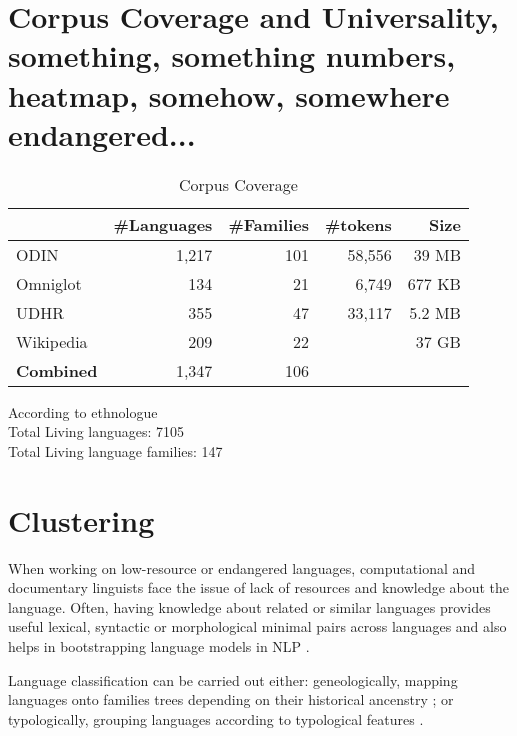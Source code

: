 % 

\section{Corpus Coverage and Universality, something, something numbers, heatmap, somehow, somewhere endangered...}
\begin{table}[h!]
\centering
    \begin{tabular}{l|rrrr}
    ~         				& \#Languages & \#Families 	&\#tokens		& Size	\\ \hline
    ODIN      				& 1,217      & 101       		& 58,556		& 39 MB		\\
    Omniglot  				& 134        & 21        		&	6,749			& 677 KB	\\
    UDHR      				& 355        & 47        		&	33,117		& 5.2 MB	\\
    Wikipedia 				& 209        & 22       		&						& 37 GB		\\ \hline
    \textbf{Combined}	& 1,347			 & 106 
    \end{tabular}
\caption{Corpus Coverage}
\end{table}

\noindent
According to ethnologue \\
Total Living languages: 7105 \\
Total Living language families: 147 \\

\newpage
\section{Clustering}
When working on low-resource or endangered languages, computational and documentary linguists face the issue of lack of resources and knowledge about the language. Often, having knowledge about related or similar languages provides useful lexical, syntactic or morphological minimal pairs across languages and also helps in bootstrapping language models in NLP \cite{yarowsky:ngai:2001,xia2007multilingual}.

Language classification can be carried out either: geneologically, mapping languages onto families trees depending on their historical ancenstry \cite{swadesh1952,starostin2010}; or typologically, grouping languages according to typological features \cite{georgi2010wals,daume2009}.

